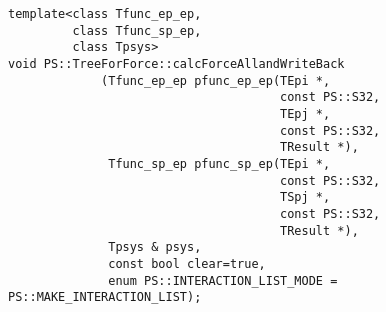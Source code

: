 \begin{screen}
\begin{verbatim}
template<class Tfunc_ep_ep,
         class Tfunc_sp_ep,
         class Tpsys>
void PS::TreeForForce::calcForceAllandWriteBack
             (Tfunc_ep_ep pfunc_ep_ep(TEpi *,
                                      const PS::S32,
                                      TEpj *,
                                      const PS::S32,
                                      TResult *),
              Tfunc_sp_ep pfunc_sp_ep(TEpi *,
                                      const PS::S32,
                                      TSpj *,
                                      const PS::S32,
                                      TResult *),
              Tpsys & psys,
              const bool clear=true,
              enum PS::INTERACTION_LIST_MODE = PS::MAKE_INTERACTION_LIST);
\end{verbatim}
\end{screen}

